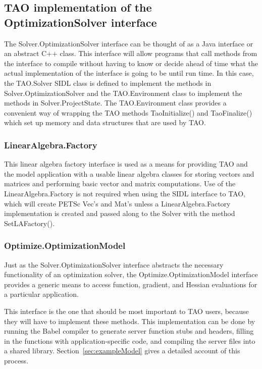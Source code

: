 \documentclass[doublespacing,12pt]{article}
\begin{document}
\subsection{TAO implementation of the OptimizationSolver interface}\label{sec:TAOimplementation}
The \textsf{Sol\-ver.Op\-ti\-mi\-za\-tion\-Sol\-ver} interface can be thought of as a Java
interface or an abstract C++ class.  This interface will allow programs that
call methods from the interface to compile without having to know or
decide ahead of time what the actual implementation of the interface
is going to be until run time.  In this case, the \textsf{TAO.Solver} SIDL
class is
defined to implement the methods in Sol\-ver.Op\-ti\-mi\-za\-tion\-Sol\-ver and
the \textsf{TAO.En\-vi\-ron\-ment} class to implement the methods in
\textsf{Sol\-ver.Pro\-ject\-State}.  
The \textsf{TAO.En\-vi\-ron\-ment} class provides a convenient way of wrapping the TAO methods
\textsf{TaoInitialize()} and \textsf{TaoFinalize()} which set up memory and
data structures that are used by TAO. 

\subsubsection{LinearAlgebra.Factory}
This linear algebra factory interface is used as a means for providing
TAO and the model application with a usable linear algebra classes for
storing vectors and matrices and performing basic vector and matrix
computations.  Use of the \textsf{Lin\-ear\-Al\-ge\-bra.Fact\-ory} is not required when
using the SIDL interface to TAO, which will create PETSc Vec's and
Mat's unless a
\textsf{Lin\-ear\-Al\-ge\-bra.Fact\-ory} implementation is created and passed along to
the Solver with the method \textsf{SetLAFact\-ory()}. 


\subsubsection{Optimize.OptimizationModel}\label{sec:optimizationModel}
Just as the \textsf{Sol\-ver.Op\-ti\-mi\-za\-tion\-Sol\-ver} interface abstracts the
necessary functionality of an optimization solver, the
\textsf{Optimize.Op\-ti\-mi\-za\-tion\-Mod\-el} interface provides a generic means 
to access
function, gradient, and Hessian evaluations for a particular
application.  

This interface is the one that should be most important to TAO users,
because they will have to implement these methods.  This
implementation can be done
by running the Babel compiler to generate server function stubs and
headers, filling in the functions with application-specific code, and
compiling the server files into a shared library.  Section~\ref{sec:exampleModel} gives a detailed account of this process.
\end{document}
